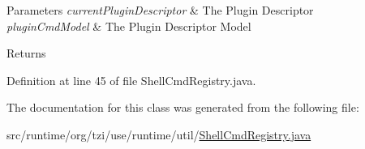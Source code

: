 \begin{DoxyParams}{Parameters}
{\em current\-Plugin\-Descriptor} & The Plugin Descriptor \\
\hline
{\em plugin\-Cmd\-Model} & The Plugin Descriptor Model \\
\hline
\end{DoxyParams}
\begin{DoxyReturn}{Returns}

\end{DoxyReturn}


Definition at line 45 of file Shell\-Cmd\-Registry.\-java.



The documentation for this class was generated from the following file\-:\begin{DoxyCompactItemize}
\item 
src/runtime/org/tzi/use/runtime/util/\hyperlink{_shell_cmd_registry_8java}{Shell\-Cmd\-Registry.\-java}\end{DoxyCompactItemize}
